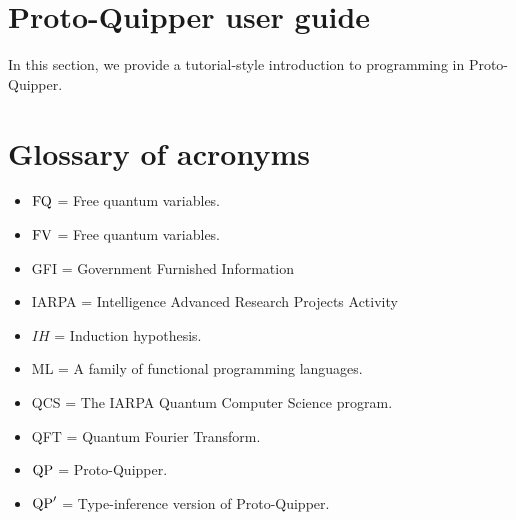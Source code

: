 \documentclass[twoside]{article}
\begin{document}
\clearpage
\section{Proto-Quipper user guide}
\label{sec-user-guide}

In this section, we provide a tutorial-style introduction to 
programming in Proto-Quipper. 



\clearpage
\section*{Glossary of acronyms}

\begin{itemize}
  \item $\mathop{\textrm{FQ}}\nolimits$ = Free quantum variables.
  \item $\mathop{\textrm{FV}}\nolimits$ = Free quantum variables.
  \item GFI = Government Furnished Information
  \item IARPA = Intelligence Advanced Research Projects Activity
  \item $IH$ = Induction hypothesis.
  \item ML = A family of functional programming languages.
  \item QCS = The IARPA Quantum Computer Science program.
  \item QFT = Quantum Fourier Transform.
  \item ${\rm QP}$ = Proto-Quipper.
  \item ${\rm QP}'$ = Type-inference version of Proto-Quipper.
\end{itemize}

\clearpage

{}

\end{document}
